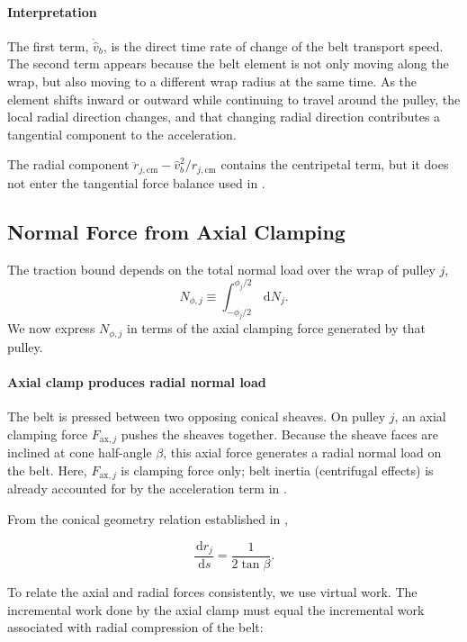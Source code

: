 \documentclass[11pt]{article}
\numberwithin{equation}{section}
\newcommand{\dd}{\,\mathrm{d}}
\begin{document}
\paragraph{Interpretation}

The first term, \(\dot{\hat v}_b\), is the direct time rate of change of the
belt transport speed.
The second term appears because the belt element is not only moving along the wrap, 
but also moving to a different wrap radius at the same time. As the element shifts 
inward or outward while continuing to travel around the pulley, the local radial 
direction changes, and that changing radial direction contributes a tangential 
component to the acceleration.

The radial component
\(
\ddot r_{j,\mathrm{cm}} - \hat v_b^2/r_{j,\mathrm{cm}}
\)
contains the centripetal term, but it does not enter the tangential force
balance used in .

\subsection{Normal Force from Axial Clamping}
\label{sec:normal_from_clamp}

The traction bound  depends on the total normal load
over the wrap of pulley \(j\),
\[
N_{\phi,j} \equiv \int_{-\phi_j/2}^{\phi_j/2} \dd N_j.
\]
We now express \(N_{\phi,j}\) in terms of the axial clamping force
generated by that pulley.

\paragraph{Axial clamp produces radial normal load}

The belt is pressed between two opposing conical sheaves.
On pulley \(j\), an axial clamping force \(F_{\mathrm{ax},j}\) pushes the
sheaves together.
Because the sheave faces are inclined at cone half-angle \(\beta\),
this axial force generates a radial normal load on the belt.
Here, \(F_{\mathrm{ax},j}\) is clamping force only; belt inertia
(centrifugal effects) is already accounted for by the acceleration term in
.

From the conical geometry relation established in
,

\[
\frac{\dd r_j}{\dd s} = \frac{1}{2\tan\beta}.
\]

To relate the axial and radial forces consistently, we use virtual work.
The incremental work done by the axial clamp must equal the incremental
work associated with radial compression of the belt:
\end{document}
